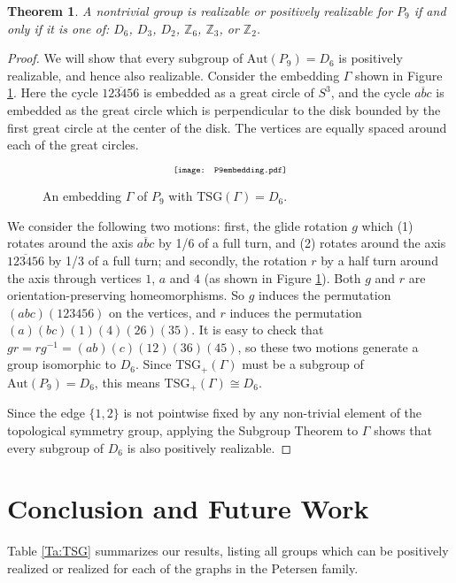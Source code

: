 \documentclass[11]{amsart}
\def\Z{\mathbb{Z}}
\def\TSG{{\mathrm{TSG}}}
\def\Aut{{\mathrm{Aut}}}
\newtheorem{theorem}{Theorem}[section]
\theoremstyle{definition}
\theoremstyle{remark}
\begin{document}
\begin{theorem}\label{T:P9}
A nontrivial group is realizable or positively realizable for $P_9$ if and only if it is one of: $D_6$, $D_3$, $D_2$, $\Z_6$, $\Z_3$, or $\Z_2$.
\end{theorem}
\begin{proof}
We will show that every subgroup of $\Aut(P_9) = D_6$ is positively realizable, and hence also realizable. Consider the embedding $\Gamma$ shown in Figure \ref{F:P9D6}.  Here the cycle $\overline{123456}$ is embedded as a great circle of $S^3$, and the cycle $\overline{abc}$ is embedded as the great circle which is perpendicular to the disk bounded by the first great circle at the center of the disk. The vertices are equally spaced around each of the great circles.

\begin{figure} [h]
$$\scalebox{.7}{\texttt{[image: P9embedding.pdf]}}$$
\caption{An embedding $\Gamma$ of $P_9$ with $\TSG(\Gamma) = D_6$.}
\label{F:P9D6}
\end{figure}

We consider the following two motions: first, the glide rotation $g$ which (1) rotates around the axis $\overline{abc}$ by 1/6 of a full turn, and (2) rotates around the axis $\overline{123456}$ by 1/3 of a full turn; and secondly, the rotation $r$ by a half turn around the axis through vertices $1$, $a$ and $4$ (as shown in Figure \ref{F:P9D6}).  Both $g$ and $r$ are orientation-preserving homeomorphisms. So $g$ induces the permutation $(abc)(123456)$ on the vertices, and $r$ induces the permutation $(a)(bc)(1)(4)(26)(35)$. It is easy to check that $gr = rg^{-1} = (ab)(c)(12)(36)(45)$, so these two motions generate a group isomorphic to $D_6$. Since $\TSG_+(\Gamma)$ must be a subgroup of $\Aut(P_9) = D_6$, this means $\TSG_+(\Gamma) \cong D_6$.

Since the edge $\{1,2\}$ is not pointwise fixed by any non-trivial element of the topological symmetry group, applying the Subgroup Theorem to $\Gamma$ shows that every subgroup of $D_6$ is also positively realizable.
\end{proof}

\section{Conclusion and Future Work}

Table \ref{Ta:TSG} summarizes our results, listing all groups which can be positively realized or realized for each of the graphs in the Petersen family.
\end{document}
